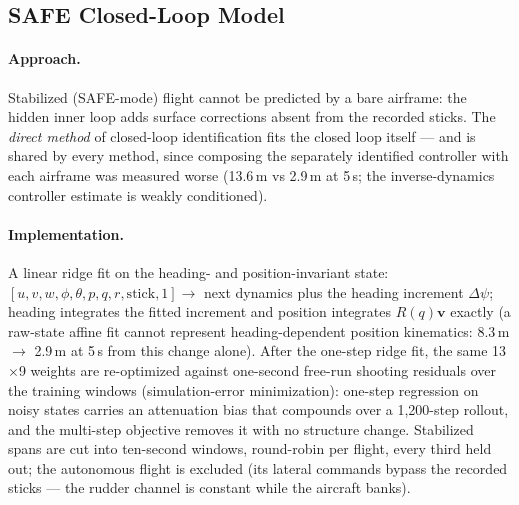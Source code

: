 \documentclass[11pt]{article}
\begin{document}
\subsection{SAFE Closed-Loop Model}
\paragraph{Approach.} Stabilized (SAFE-mode) flight cannot be predicted by
a bare airframe: the hidden inner loop adds surface corrections absent from
the recorded sticks. The \emph{direct method} of closed-loop identification
\cite{ljung1999system} fits the closed loop itself --- and is shared by
every method, since composing the separately identified controller with
each airframe was measured worse (13.6\,m vs 2.9\,m at 5\,s; the
inverse-dynamics controller estimate is weakly conditioned).
\paragraph{Implementation.} A linear ridge fit on the heading- and
position-invariant state: $[u,v,w,\phi,\theta,p,q,r,\mathrm{stick},1]
\rightarrow$ next dynamics plus the heading increment $\Delta\psi$;
heading integrates the fitted increment and position integrates
$R(q)\mathbf v$ exactly (a raw-state affine fit cannot represent
heading-dependent position kinematics: 8.3\,m $\rightarrow$ 2.9\,m at 5\,s
from this change alone). After the one-step ridge fit, the same
13$\times$9 weights are re-optimized against one-second free-run shooting
residuals over the training windows (simulation-error minimization):
one-step regression on noisy states carries an attenuation bias that
compounds over a 1{,}200-step rollout, and the multi-step objective removes
it with no structure change. Stabilized spans are cut into ten-second
windows, round-robin per flight, every third held out; the autonomous
flight is excluded (its lateral commands bypass the recorded sticks --- the
rudder channel is constant while the aircraft banks).
\end{document}
